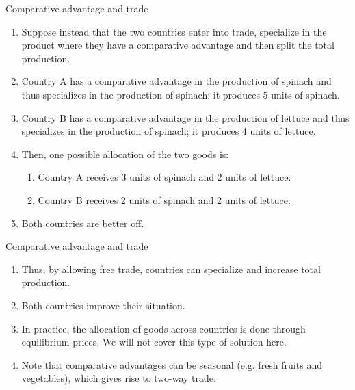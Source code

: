 \documentclass[table,xcolor=pdftex,dvipsnames]{beamer}\usepackage[]{graphicx}\usepackage[]{color}
\begin{document}

\begin{frame}{Comparative advantage and trade}
\begin{enumerate}[label=\textbullet]
    \item Suppose instead that the two countries enter into trade, specialize in the product where they have a comparative advantage and then split the total production.
    \item Country A has a comparative advantage in the production of spinach and thus specializes in the production of spinach; it produces 5 units of spinach.
    \item Country B has a comparative advantage in the production of lettuce and thus specializes in the production of spinach; it produces 4 units of lettuce.
    \item Then, one possible allocation of the two goods is:
      \begin{enumerate}[label=-]
        \item Country A receives 3 units of spinach and 2 units of lettuce.
        \item Country B receives 2 units of spinach and 2 units of lettuce.
      \end{enumerate}
    \item Both countries are better off.
\end{enumerate}
\end{frame}


\begin{frame}{Comparative advantage and trade}
\begin{enumerate}[label=\textbullet]
    \item Thus, by allowing free trade, countries can specialize and increase total production.
    \item Both countries improve their situation.
    \item In practice, the allocation of goods across countries is done through equilibrium prices. We will not cover this type of solution here.
    \item Note that comparative advantages can be seasonal (e.g. fresh fruits and vegetables), which gives rise to two-way trade.
\end{enumerate}
\end{frame}
\end{document}
